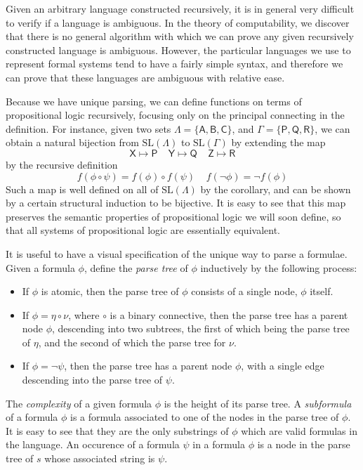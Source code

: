 Given an arbitrary language constructed recursively, it is in general very difficult to verify if a language is ambiguous. In the theory of computability, we discover that there is no general algorithm with which we can prove any given recursively constructed language is ambiguous. However, the particular languages we use to represent formal systems tend to have a fairly simple syntax, and therefore we can prove that these languages are ambiguous with relative ease.

Because we have unique parsing, we can define functions on terms of propositional logic recursively, focusing only on the principal connecting in the definition. For instance, given two sets $\Lambda = \{ \mathsf{A, B, C} \}$, and $\Gamma = \{ \mathsf{P, Q, R} \}$, we can obtain a natural bijection from $\text{SL}(\Lambda)$ to $\text{SL}(\Gamma)$ by extending the map
%
\[ \mathsf{X} \mapsto \mathsf{P}\ \ \ \ \ \mathsf{Y} \mapsto \mathsf{Q}\ \ \ \ \ \mathsf{Z} \mapsto \mathsf{R} \]
%
by the recursive definition
%
\[ f(\phi \circ \psi) = f(\phi) \circ f(\psi)\ \ \ \ \ f(\neg \phi) = \neg f(\phi) \]
%
Such a map is well defined on all of $\text{SL}(\Lambda)$ by the corollary, and can be shown by a certain structural induction to be bijective. It is easy to see that this map preserves the semantic properties of propositional logic we will soon define, so that all systems of propositional logic are essentially equivalent.

It is useful to have a visual specification of the unique way to parse a formulae. Given a formula $\phi$, define the \emph{parse tree} of $\phi$ inductively by the following process:
%
\begin{itemize}
    \item If $\phi$ is atomic, then the parse tree of $\phi$ consists of a single node, $\phi$ itself.
    \item If $\phi = \eta \circ \nu$, where $\circ$ is a binary connective, then the parse tree has a parent node $\phi$, descending into two subtrees, the first of which being the parse tree of $\eta$, and the second of which the parse tree for $\nu$.
    \item If $\phi = \neg \psi$, then the parse tree has a parent node $\phi$, with a single edge descending into the parse tree of $\psi$.
\end{itemize}
%
The \emph{complexity} of a given formula $\phi$ is the height of its parse tree. A \emph{subformula} of a formula $\phi$ is a formula associated to one of the nodes in the parse tree of $\phi$. It is easy to see that they are the only substrings of $\phi$ which are valid formulas in the language. An occurence of a formula $\psi$ in a formula $\phi$ is a node in the parse tree of $s$ whose associated string is $\psi$.

